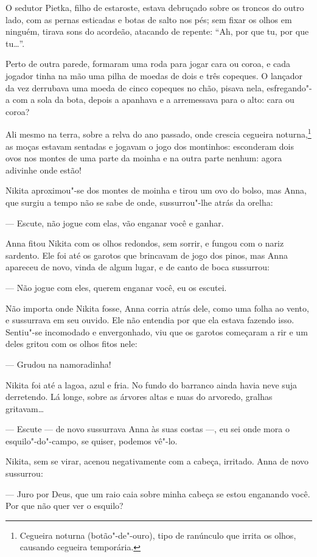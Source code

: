 O sedutor Pietka, filho de estaroste, estava debruçado sobre os troncos
do outro lado, com as pernas esticadas e botas de salto nos pés; sem
fixar os olhos em ninguém, tirava sons do acordeão, atacando de repente:
``Ah, por que tu, por que tu\ldots{}''.

Perto de outra parede, formaram uma roda para jogar cara ou coroa, e
cada jogador tinha na mão uma pilha de moedas de dois e três
copeques. O lançador da vez derrubava uma moeda de cinco copeques no
chão, pisava nela, esfregando"-a com a sola da bota, depois a apanhava e
a arremessava para o alto: cara ou coroa?

Ali mesmo na terra, sobre a relva do ano passado, onde crescia cegueira
noturna,\footnote{Cegueira noturna (botão"-de"-ouro), tipo de ranúnculo
  que irrita os olhos, causando cegueira temporária.} as moças estavam
sentadas e jogavam o jogo dos montinhos: esconderam dois ovos nos montes
de uma parte da moinha e na outra parte nenhum: agora adivinhe onde
estão!

Nikita aproximou"-se dos montes de moinha e tirou um ovo do bolso, mas
Anna, que surgiu a tempo não se sabe de onde, sussurrou"-lhe atrás da
orelha:

--- Escute, não jogue com elas, vão enganar você e ganhar.

Anna fitou Nikita com os olhos redondos, sem sorrir, e fungou com o
nariz sardento. Ele foi até os garotos que brincavam de jogo dos pinos,
mas Anna apareceu de novo, vinda de algum lugar, e de canto de boca
sussurrou:

--- Não jogue com eles, querem enganar você, eu os escutei.

Não importa onde Nikita fosse, Anna corria atrás dele, como uma folha ao
vento, e sussurrava em seu ouvido. Ele não entendia por que ela estava
fazendo isso. Sentiu"-se incomodado e envergonhado, viu que os garotos
começaram a rir e um deles gritou com os olhos fitos nele:

--- Grudou na namoradinha!

Nikita foi até a lagoa, azul e fria. No fundo do barranco ainda havia
neve suja derretendo. Lá longe, sobre as árvores altas e nuas do
arvoredo, gralhas gritavam\ldots{}

--- Escute --- de novo sussurrava Anna às suas costas ---, eu sei onde
mora o esquilo"-do"-campo, se quiser, podemos vê"-lo.

Nikita, sem se virar, acenou negativamente com a cabeça, irritado. Anna
de novo sussurrou:

--- Juro por Deus, que um raio caia sobre minha cabeça se estou
enganando você. Por que não quer ver o esquilo?

